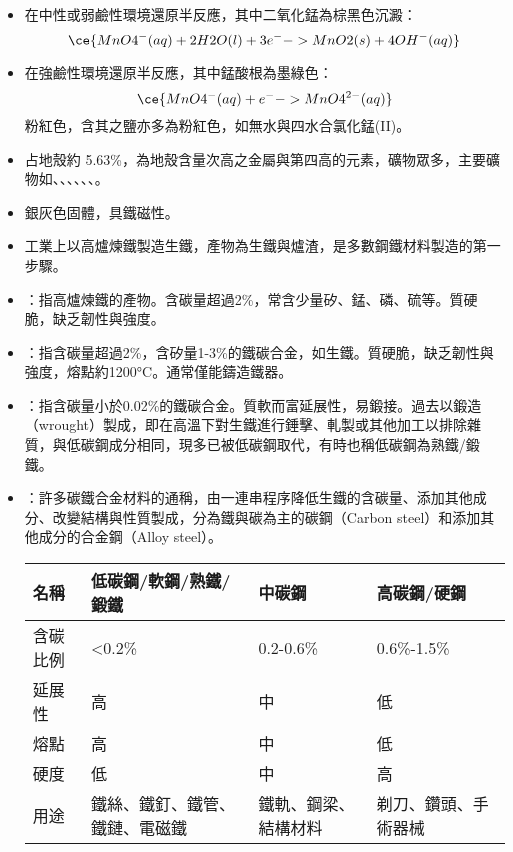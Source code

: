 \documentclass[a4paper,12pt]{report}
\begin{document}
\begin{itemize}
\begin{itemize}
\item 在中性或弱鹼性環境還原半反應，其中二氧化錳為棕黑色沉澱：
\[\ce{MnO4^-(aq) + 2H2O(l) + 3e^- -> MnO2(s) + 4OH^-(aq)}\]
\item 在強鹼性環境還原半反應，其中錳酸根為墨綠色：
\[\ce{MnO4^-(aq) + e^- -> MnO4^{2-}(aq)}\]
\eit
{}
粉紅色，含其之鹽亦多為粉紅色，如無水與四水合氯化錳(II)。
\bit
\item 占地殼約 5.63\%，為地殼含量次高之金屬與第四高的元素，礦物眾多，主要礦物如、、、、、、。
\item 銀灰色固體，具鐵磁性。
\item 工業上以高爐煉鐵製造生鐵，產物為生鐵與爐渣，是多數鋼鐵材料製造的第一步驟。
\item {}：指高爐煉鐵的產物。含碳量超過2\%，常含少量矽、錳、磷、硫等。質硬脆，缺乏韌性與強度。
\item {}：指含碳量超過2\%，含矽量1-3\%的鐵碳合金，如生鐵。質硬脆，缺乏韌性與強度，熔點約1200°C。通常僅能鑄造鐵器。
\item {}：指含碳量小於0.02\%的鐵碳合金。質軟而富延展性，易鍛接。過去以鍛造（wrought）製成，即在高溫下對生鐵進行錘擊、軋製或其他加工以排除雜質，與低碳鋼成分相同，現多已被低碳鋼取代，有時也稱低碳鋼為熟鐵/鍛鐵。
\item {}：許多碳鐵合金材料的通稱，由一連串程序降低生鐵的含碳量、添加其他成分、改變結構與性質製成，分為鐵與碳為主的碳鋼（Carbon steel）和添加其他成分的合金鋼（Alloy steel）。
\eit
{}
\begin{longtable}[c]{|p{0.2\tw}|p{0.2\tw}|p{0.2\tw}|p{0.2\tw}|}
\hline
名稱 & 低碳鋼/軟鋼/熟鐵/鍛鐵 & 中碳鋼 & 高碳鋼/硬鋼 \\\hline
含碳比例 & <0.2\% & 0.2-0.6\% & 0.6\%-1.5\% \\\hline
延展性 & 高 & 中 & 低 \\\hline
熔點 & 高 & 中 & 低 \\\hline
硬度 & 低 & 中 & 高 \\\hline
用途 & 鐵絲、鐵釘、鐵管、鐵鏈、電磁鐵 & 鐵軌、鋼梁、結構材料 & 剃刀、鑽頭、手術器械 \\\hline
\end{longtable}\FloatBarrier

\end{itemize}
\end{itemize}
\end{document}
